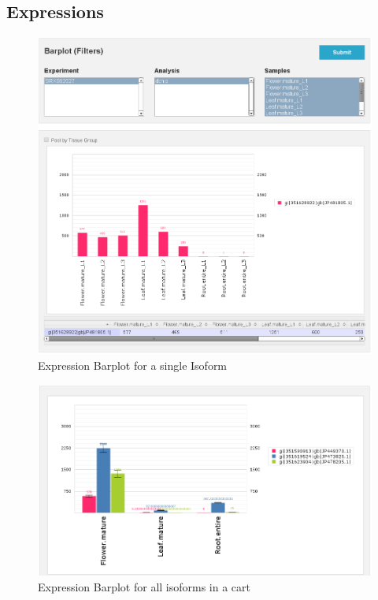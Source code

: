 \documentclass[english]{scrartcl}
\begin{document}
\subsection{Expressions}
\begin{figure}
\begin{center}
  \includegraphics[width=\textwidth]{figures/barplot_iso.png}
  \caption{Expression Barplot for a single Isoform}
  \label{fig:barplot_iso}
\end{center}
\end{figure}
\begin{figure}
\begin{center}
  \includegraphics[width=\textwidth]{figures/barplot_cart.png}
  \caption{Expression Barplot for all isoforms in a cart}
  \label{fig:barplot_cart}
\end{center}
\end{figure}
\end{document}
